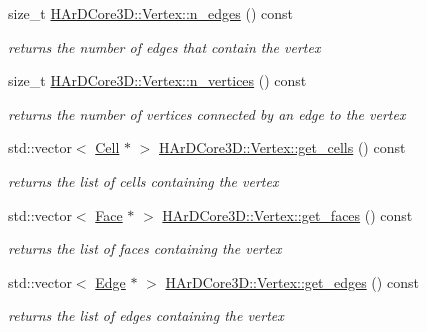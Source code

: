 \begin{DoxyCompactItemize}
\mbox{\label{group__Mesh_ga66696dc0256731709df2562cd3186c5a}} 
size\+\_\+t \hyperlink{group__Mesh_ga66696dc0256731709df2562cd3186c5a}{H\+Ar\+D\+Core3\+D\+::\+Vertex\+::n\+\_\+edges} () const
\begin{DoxyCompactList}\small\item\em returns the number of edges that contain the vertex \end{DoxyCompactList}\item 
\mbox{\label{group__Mesh_ga586937c732852e91b1ddbe8d0df07899}} 
size\+\_\+t \hyperlink{group__Mesh_ga586937c732852e91b1ddbe8d0df07899}{H\+Ar\+D\+Core3\+D\+::\+Vertex\+::n\+\_\+vertices} () const
\begin{DoxyCompactList}\small\item\em returns the number of vertices connected by an edge to the vertex \end{DoxyCompactList}\item 
\mbox{\label{group__Mesh_ga8127e549619aee2111dbf603e53cb5cb}} 
std\+::vector$<$ \hyperlink{classHArDCore3D_1_1Cell}{Cell} $\ast$ $>$ \hyperlink{group__Mesh_ga8127e549619aee2111dbf603e53cb5cb}{H\+Ar\+D\+Core3\+D\+::\+Vertex\+::get\+\_\+cells} () const
\begin{DoxyCompactList}\small\item\em returns the list of cells containing the vertex \end{DoxyCompactList}\item 
\mbox{\label{group__Mesh_gaa325f9d26be25eef1d69f8bef98490c3}} 
std\+::vector$<$ \hyperlink{classHArDCore3D_1_1Face}{Face} $\ast$ $>$ \hyperlink{group__Mesh_gaa325f9d26be25eef1d69f8bef98490c3}{H\+Ar\+D\+Core3\+D\+::\+Vertex\+::get\+\_\+faces} () const
\begin{DoxyCompactList}\small\item\em returns the list of faces containing the vertex \end{DoxyCompactList}\item 
\mbox{\label{group__Mesh_gaa573992f8b8942be8f665ca0670cb738}} 
std\+::vector$<$ \hyperlink{classHArDCore3D_1_1Edge}{Edge} $\ast$ $>$ \hyperlink{group__Mesh_gaa573992f8b8942be8f665ca0670cb738}{H\+Ar\+D\+Core3\+D\+::\+Vertex\+::get\+\_\+edges} () const
\begin{DoxyCompactList}\small\item\em returns the list of edges containing the vertex \end{DoxyCompactList}\item 

\end{DoxyCompactItemize}
